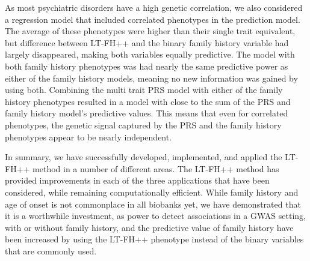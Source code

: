 As most psychiatric disorders have a high genetic correlation, we also considered a regression model that included correlated phenotypes in the prediction model. The average of these phenotypes were higher than their single trait equivalent, but difference between LT-FH++ and the binary family history variable had largely disappeared, making both variables equally predictive. The model with both family history phenotypes was had nearly the same predictive power as either of the family history models, meaning no new information was gained by using both. Combining the multi trait PRS model with either of the family history phenotypes resulted in a model with close to the sum of the PRS and family history model's predictive values. This means that even for correlated phenotypes, the genetic signal captured by the PRS and the family history phenotypes appear to be nearly independent.

In summary, we have successfully developed, implemented, and applied the LT-FH++ method in a number of different areas. The LT-FH++ method has provided improvements in each of the three applications that have been considered, while remaining computationally efficient. While family history and age of onset is not commonplace in all biobanks yet, we have demonstrated that it is a worthwhile investment, as power to detect associations in a GWAS setting, with or without family history, and the predictive value of family history have been increased by using the LT-FH++ phenotype instead of the binary variables that are commonly used.


